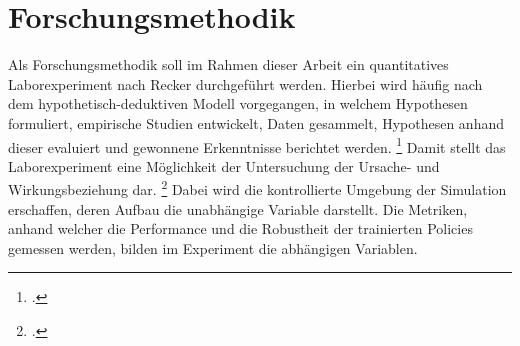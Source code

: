 \section{Forschungsmethodik}

Als Forschungsmethodik soll im Rahmen dieser Arbeit ein quantitatives Laborexperiment nach Recker \cite*[]{Recker.2021} durchgeführt werden.
Hierbei wird häufig nach dem hypothetisch-deduktiven Modell vorgegangen, in welchem Hypothesen formuliert, empirische Studien entwickelt, Daten gesammelt, Hypothesen anhand dieser evaluiert und gewonnene Erkenntnisse berichtet werden. \footcite[Vgl.][S. S.89f.]{Recker.2021}
Damit stellt das Laborexperiment eine Möglichkeit der Untersuchung der Ursache- und Wirkungsbeziehung dar. \footcite[Vgl.][S. 106]{Recker.2021}
Dabei wird die kontrollierte Umgebung der Simulation erschaffen, deren Aufbau die unabhängige Variable darstellt.
Die Metriken, anhand welcher die Performance und die Robustheit der trainierten Policies gemessen werden, bilden im Experiment die abhängigen Variablen.

